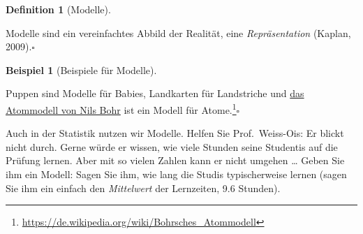 \documentclass[
  a4paper,
]{scrbook}
\theoremstyle{definition}
\newtheorem{example}{Beispiel}[chapter]
\theoremstyle{definition}
\newtheorem{definition}{Definition}[chapter]
\theoremstyle{definition}
\theoremstyle{remark}
\begin{document}
\begin{definition}[Modelle]\protect\hypertarget{def-modelle}{}\label{def-modelle}

Modelle sind ein vereinfachtes Abbild der Realität, eine
\emph{Repräsentation} (Kaplan, 2009).\(\square\)

\end{definition}

\begin{example}[Beispiele für
Modelle]\protect\hypertarget{exm-Modelle}{}\label{exm-Modelle}

Puppen sind Modelle für Babies, Landkarten für Landstriche und
\href{https://de.wikipedia.org/wiki/Bohrsches_Atommodell}{das Atommodell
von Nils Bohr} ist ein Modell für Atome.\footnote{\url{https://de.wikipedia.org/wiki/Bohrsches_Atommodell}}\(\square\)

\end{example}

Auch in der Statistik nutzen wir Modelle. Helfen Sie Prof.~Weiss-Ois: Er
blickt nicht durch. Gerne würde er wissen, wie viele Stunden seine
Studentis auf die Prüfung lernen. Aber mit so vielen Zahlen kann er
nicht umgehen \ldots{} Geben Sie ihm ein Modell: Sagen Sie ihm, wie lang
die Studis typischerweise lernen (sagen Sie ihm ein einfach den
\emph{Mittelwert} der Lernzeiten, 9.6 Stunden).
\end{document}
